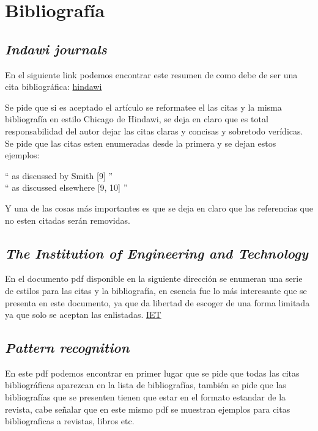 \documentclass[letterpaper, 10 pt]{article}
\begin{document}
\section*{Bibliografía}
\subsection*{{\textit{Indawi journals}}}
En el siguiente link podemos encontrar este resumen de como debe de ser una cita bibliográfica: \href{https://www.hindawi.com/journals/je/guidelines/}{hindawi}

Se pide que si es aceptado el artículo se reformatee el las citas y la misma bibliografía en estilo Chicago de Hindawi, se deja en claro que es total responsabilidad del autor dejar las citas claras y concisas y sobretodo verídicas. Se pide que las citas esten enumeradas desde la primera y se dejan estos ejemplos:
\begin{center}
	`` as discussed by Smith [9] '' \\ `` as discussed elsewhere [9, 10] ''
\end{center}  
Y una de las cosas más importantes es que se deja en claro que las referencias que no esten citadas serán removidas.
\subsection*{{\textit{The Institution of Engineering and Technology}}}
En el documento pdf disponible en la siguiente dirección se enumeran una serie de estilos para las citas y la bibliografía, en esencia fue lo más interesante que se presenta en este documento, ya que da libertad de escoger de una forma limitada ya que solo se aceptan las enlistadas.
\href{https://authorservices.wiley.com/asset/Author%20Guidelines%20Standard%20Reference%20Text.pdf}{IET}

\subsection*{{\textit{Pattern recognition}}}
En este pdf podemos encontrar en primer lugar que se pide que todas las citas bibliográficas aparezcan en la lista de bibliografías, también se pide que las bibliografías que se presenten tienen que estar en el formato estandar de la revista, cabe señalar que en este mismo pdf se muestran ejemplos para citas bibliograficas a revistas, libros etc.
\end{document}
